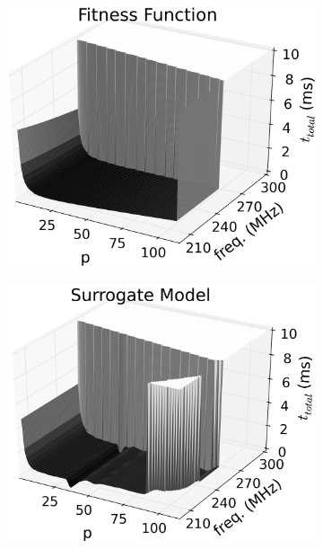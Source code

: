 \documentclass[runningheads,a4paper]{llncs}
\begin{document}
\begin{figure}
        \centering
        \begin{subfigure}{0.32\textwidth}
                \centering
                \includegraphics[width=\textwidth]{./figs/fitness_radio.png}
        \end{subfigure}
        \begin{subfigure}{0.32\textwidth}
                \centering
                \includegraphics[width=\textwidth]{./figs/surmodel025_44.png}
        \end{subfigure}

\end{figure}
\end{document}
